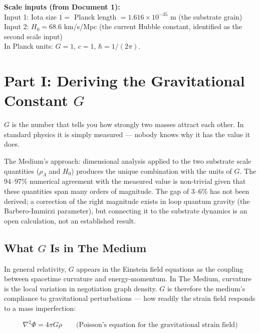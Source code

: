 \documentclass[11pt,letterpaper]{article}
\newenvironment{plainbox}{\begin{tcolorbox}[colback=blue!3!white,colframe=blue!40!white,title={\small\textit{In plain language}},breakable]}{\end{tcolorbox}}
\newenvironment{defbox}{\begin{tcolorbox}[colback=green!3!white,colframe=green!45!black,title={\small\textit{Key result}},breakable]}{\end{tcolorbox}}
\begin{document}
\begin{defbox}
\textbf{Scale inputs (from Document 1):}\\[4pt]
Input 1: Iota size $1 =$ Planck length $= 1.616 \times 10^{-35}$ m \quad (the substrate grain)\\
Input 2: $H_0 = 68.6$ km/s/Mpc \quad (the current Hubble constant, identified as the second scale input)\\[4pt]
In Planck units: $G = 1$, $c = 1$, $\hbar = 1/(2\pi)$.
\end{defbox}

\section{Part I: Deriving the Gravitational Constant \(G\)}
\label{sec:org37223ff}

\begin{plainbox}
$G$ is the number that tells you how strongly two masses attract each other. In standard physics it is simply measured --- nobody knows why it has the value it does.

The Medium's approach: dimensional analysis applied to the two substrate scale quantities (\(\rho_\Lambda\) and \(H_0\)) produces the unique combination with the units of \(G\). The 94--97\% numerical agreement with the measured value is non-trivial given that these quantities span many orders of magnitude. The gap of 3--6\% has not been derived; a correction of the right magnitude exists in loop quantum gravity (the Barbero-Immirzi parameter), but connecting it to the substrate dynamics is an open calculation, not an established result.
\end{plainbox}

\subsection{What \(G\) Is in The Medium}
\label{sec:org485589b}

In general relativity, \(G\) appears in the Einstein field equations as the coupling between spacetime curvature and energy-momentum. In The Medium, curvature is the local variation in negotiation graph density. \(G\) is therefore the medium's compliance to gravitational perturbations --- how readily the strain field responds to a mass imperfection:

\begin{equation}
\nabla^2\Phi = 4\pi G\rho \qquad \text{(Poisson's equation for the gravitational strain field)}
\end{equation}
\end{document}
